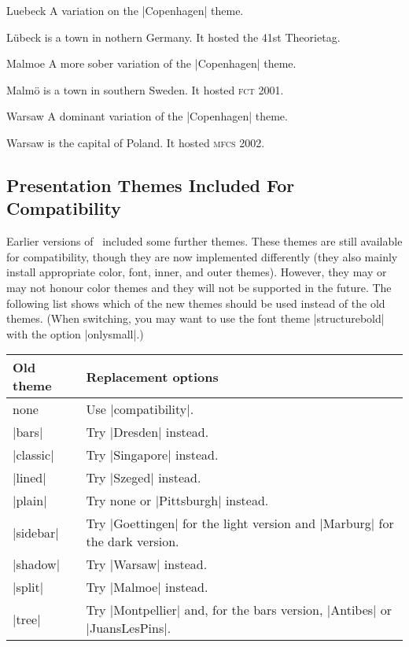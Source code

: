 \begin{themeexample}{Luebeck}
  A variation on the |Copenhagen| theme.

  L\"ubeck is a town in nothern Germany. It hosted the 41st Theorietag.
\end{themeexample}

\begin{themeexample}{Malmoe}
  A more sober variation of the |Copenhagen| theme.

  Malm\"o is a town in southern Sweden. It hosted \textsc{fct} 2001.
\end{themeexample}


\begin{themeexample}{Warsaw}
  A dominant variation of the |Copenhagen| theme.

  Warsaw is the capital of Poland. It hosted \textsc{mfcs} 2002.
\end{themeexample}


\subsection{Presentation Themes Included For Compatibility}

Earlier versions of \beamer\ included some further themes. These themes are still available for compatibility, though they are now implemented differently (they also mainly install appropriate color, font, inner, and outer themes). However, they may or may not honour color themes and they will not be supported in the future. The following list shows which of the new themes should be used instead of the old themes. (When switching, you may want to use the font theme |structurebold| with the option |onlysmall|.)

\medskip
\begin{tabular}{lp{13cm}}
  Old theme & Replacement options \\\hline
  none & Use |compatibility|. \\
  |bars| & Try |Dresden| instead. \\
  |classic| & Try |Singapore| instead. \\
  |lined| & Try |Szeged| instead. \\
  |plain| & Try none or |Pittsburgh| instead. \\
  |sidebar| & Try |Goettingen| for the light version and |Marburg| for
  the dark version. \\
  |shadow| & Try |Warsaw| instead. \\
  |split| & Try |Malmoe| instead. \\
  |tree| & Try |Montpellier| and, for the bars version, |Antibes| or
  |JuansLesPins|.
\end{tabular}

